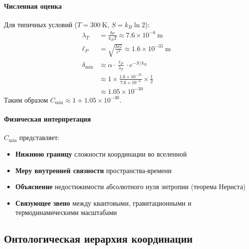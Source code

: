 \documentclass[11pt,a4paper]{article}
\begin{document}
	\paragraph{Численная оценка}
	Для типичных условий ($T = 300\ \mathrm{K}$, $S = k_B \ln 2$):
	\begin{align}
		\lambda_T &= \frac{\hbar c}{k_B T} \approx 7.6 \times 10^{-6}\ \mathrm{m} \\
		\ell_P &= \sqrt{\frac{\hbar G}{c^3}} \approx 1.6 \times 10^{-35}\ \mathrm{m} \\
		\delta_{\min} &\approx \alpha \cdot \frac{\ell_P}{\lambda_T} \cdot e^{-S/k_B} \\
		&\approx 1 \times \frac{1.6 \times 10^{-35}}{7.6 \times 10^{-6}} \times \frac{1}{2} \\
		&\approx 1.05 \times 10^{-30}
	\end{align}
	Таким образом $C_{\min} \approx 1 + 1.05 \times 10^{-30}$.
	
	\paragraph{Физическая интерпретация}
	$C_{\min}$ представляет:
	\begin{itemize}
		\item \textbf{Нижнюю границу} сложности координации во вселенной
		\item \textbf{Меру внутренней связности} пространства-времени
		\item \textbf{Объяснение} недостижимости абсолютного нуля энтропии (теорема Нернста)
		\item \textbf{Связующее звено} между квантовыми, гравитационными и термодинамическими масштабами
	\end{itemize}
	
	\subsection{Онтологическая иерархия координации}
	
\end{document}
